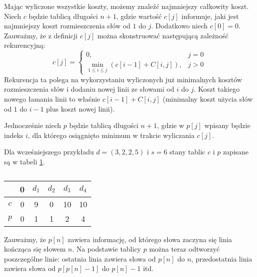 Mając wyliczone wszystkie koszty, możemy znaleźć najmniejszy całkowity koszt. Niech $c$ będzie tablicą długości $n+1$, gdzie wartość $c[j]$ informuje, jaki jest najmniejszy koszt rozmieszczenia słów od $1$ do $j$. Dodatkowo niech $c[0]=0$. Zauważmy, że z definicji $c[j]$ można skonstruować następującą zależność rekurencyjną: \[
	c[j]=\begin{cases}
		0, &j=0\\
		\min\limits_{1 \leq i \leq j}\left(c[i-1]+C[i,j]\right), &j>0
	\end{cases}
\]
Rekurencja ta polega na wykorzystaniu wyliczonych już minimalnych kosztów rozmieszczenia słów i dodaniu nowej linii ze słowami od $i$ do $j$. Koszt takiego nowego łamania linii to właśnie $c[i-1] + C[i,j]$ (minimalny koszt użycia słów od $1$ do $i-1$ plus koszt nowej linii).

Jednocześnie niech $p$ będzie tablicą długości $n+1$, gdzie w $p[j]$ wpisany będzie indeks $i$, dla którego osiągnięto minimum w trakcie wyliczania $c[j]$.

Dla wcześniejszego przykładu $d=(3,2,2,5)$ i $s=6$ stany tablic $c$ i $p$ zapisane są w tabeli \ref{tab_zad13_c}.
\begin{table}[H]
	\centering
	\def\arraystretch{1.25}
	\begin{tabular}{|c|ccccc|}
		\hline & \multicolumn{1}{c|}{0} & \multicolumn{1}{c|}{$d_1$} & \multicolumn{1}{c|}{$d_2$} & \multicolumn{1}{c|}{$d_3$} & \multicolumn{1}{c|}{$d_4$} \\ \hline
		$c$ & 0 & 9 & 0 & 10 & 10 \\ \cline{1-1}
		$p$ & 0 & 1 & 1 & 2 & 4 \\ \cline{1-1}
		\hline
	\end{tabular}
	\caption{}
	\label{tab_zad13_c}
\end{table}

Zauważmy, że $p[n]$ zawiera informację, od którego słowa zaczyna się linia kończąca się słowem $n$. Na podstawie tablicy $p$ można teraz odtworzyć poszczególne linie: ostatnia linia zawiera słowa od $p[n]$ do $n$, przedostatnia linia zawiera słowa od $p[p[n]-1]$ do $p[n]-1$ itd.

